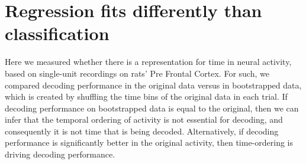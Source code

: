 \chapter{Regression fits differently than classification}
\label{chap:metrics}

Here we measured whether there is a representation for time in neural activity, based on single-unit recordings on rats' Pre Frontal Cortex. For such, we compared decoding performance in the original data versus in bootstrapped data, which is created by shuffling the time bins of the original data in each trial. If decoding performance on bootstrapped data is equal to the original, then we can infer that the temporal ordering of activity is not essential for decoding, and consequently it is not time that is being decoded. Alternatively, if decoding performance is significantly better in the original activity, then time-ordering is driving decoding performance. 


